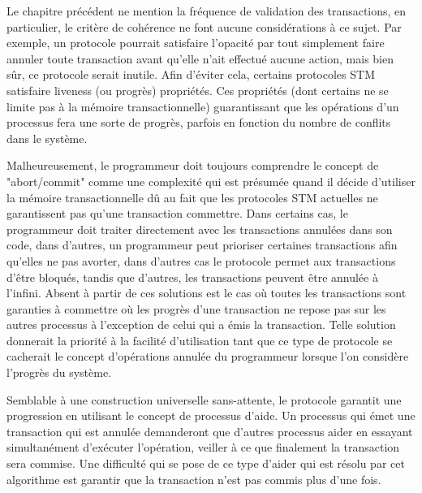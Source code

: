 Le chapitre précédent ne mention la fréquence de validation des transactions, en particulier, le critère de cohérence ne font aucune considérations à ce sujet.
Par exemple, un protocole pourrait satisfaire l'opacité par tout simplement faire annuler toute transaction avant qu'elle n'ait effectué aucune action, mais bien sûr, ce protocole serait inutile.
Afin d'éviter cela, certains protocoles STM satisfaire liveness (ou progrès) propriétés.
Ces propriétés (dont certains ne se limite pas à la mémoire transactionnelle) guarantissant que les opérations d'un processus fera une sorte de progrès, parfois en fonction du nombre de conflits dans le système.






Malheureusement, le programmeur doit toujours comprendre le concept de "abort/commit" comme une complexité qui
est présumée quand il décide d'utiliser la mémoire transactionnelle dû au fait que les protocoles STM actuelles ne garantissent pas qu'une transaction commettre.
Dans certains cas, le programmeur doit traiter directement avec les transactions annulées dans son code,
dans d'autres, un programmeur peut prioriser certaines transactions afin qu'elles ne pas avorter, dans d'autres cas le protocole permet aux transactions d'être bloqués,
tandis que d'autres, les transactions peuvent être annulée à l'infini.
Absent à partir de ces solutions est le cas où toutes les transactions sont garanties à commettre où les
progrès d'une transaction ne repose pas sur les autres processus à l'exception de celui qui a émis la transaction.
Telle solution donnerait la priorité à la facilité d'utilisation tant que ce type de protocole se cacherait le concept d'opérations annulée du programmeur lorsque l'on considère l'progrès du système.



Semblable à une construction universelle sans-attente, le protocole garantit une progression en utilisant le concept de processus d'aide.
Un processus qui émet une transaction qui est annulée demanderont que d'autres processus aider en essayant simultanément d'exécuter l'opération, veiller à ce que finalement la transaction sera commise.
Une difficulté qui se pose de ce type d'aider qui est résolu par cet algorithme est garantir que la transaction n'est pas commis plus d'une fois.




